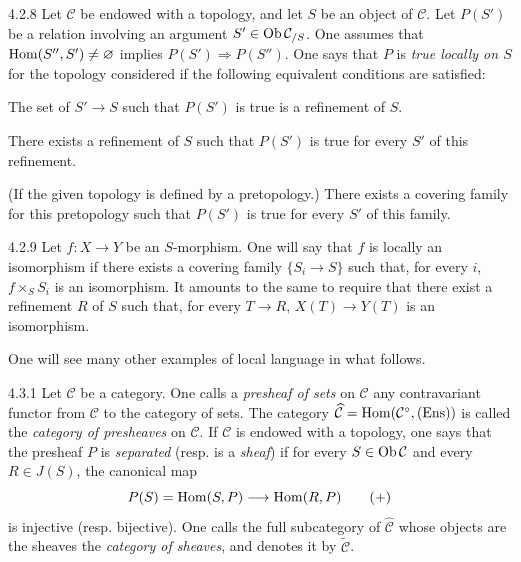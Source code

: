 \begin{definition}{4.2.8}\label{IV.4.2.8}
Let \(\mathcal C\) be endowed with a topology, and let \(S\) be an object
of \(\mathcal C\). Let \(P(S')\) be a relation involving an argument
\(S'\in\operatorname{Ob}\mathcal C_{/S}\). One assumes that
\(\operatorname{Hom}(S'',S')\ne\varnothing\) implies \(P(S')\Rightarrow P(S'')\).
One says that \(P\) is \emph{true locally on \(S\)} for the topology considered
if the following equivalent conditions are satisfied:
\begin{enumeratei}
\item The set of \(S'\to S\) such that \(P(S')\) is true is a refinement of \(S\).
\item There exists a refinement of \(S\) such that \(P(S')\) is true for every
\(S'\) of this refinement.
\item (If the given topology is defined by a pretopology.) There exists a
covering family for this pretopology such that \(P(S')\) is true for every
\(S'\) of this family.
\end{enumeratei}
\end{definition}

\begin{example}{4.2.9}\label{IV.4.2.9}
Let \(f:X\to Y\) be an \(S\)-morphism. One will say that \(f\) is locally an
isomorphism if there exists a covering family \(\{S_i\to S\}\) such that,
for every \(i\), \(f\times_S S_i\) is an isomorphism.
It amounts to the same to require that there exist a refinement \(R\) of
\(S\) such that, for every \(T\to R\), \(X(T)\to Y(T)\) is an isomorphism.
\end{example}

One will see many other examples of \og local\fg{} language in what follows.

\begin{definition}{4.3.1}\label{IV.4.3.1}
Let \(\mathcal C\) be a category. One calls a \emph{presheaf of sets} on
\(\mathcal C\) any contravariant functor from \(\mathcal C\) to the category
of sets. The category \(\widehat{\mathcal C}=\operatorname{Hom}(\mathcal C^\circ,\textup{(Ens)})\)
is called the \emph{category of presheaves} on \(\mathcal C\).
If \(\mathcal C\) is endowed with a topology, one says that the presheaf
\(P\) is \emph{separated} (resp. is a \emph{sheaf}) if for every
\(S\in\operatorname{Ob}\mathcal C\) and every \(R\in J(S)\), the canonical map
\[
P(S)=\operatorname{Hom}(S,P)\longrightarrow\operatorname{Hom}(R,P)\tag{+}
\]
is injective (resp. bijective). One calls the full subcategory of
\(\widehat{\mathcal C}\) whose objects are the sheaves the
\emph{category of sheaves}, and denotes it by \(\widetilde{\mathcal C}\).
\end{definition}

